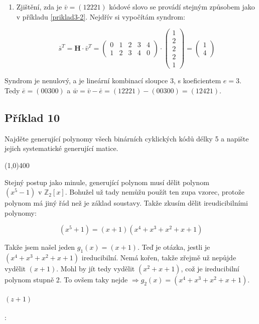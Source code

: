 \documentclass{article}
\begin{document}
\begin{enumerate}
	\item Zjištění, zda je $\bar{v} = (12221)$ kódové slovo se provádí stejným způsobem jako v příkladu \ref{priklad3-2}. Nejdřív si vypočítám syndrom:
	
	\[ \bar{s}^T = \mathbf{H}\cdot\bar{v}^T = 
	\begin{pmatrix}
		0 & 1 & 2 & 3 & 4 \\
	  1 & 2 & 3 & 4 & 0
	\end{pmatrix}\cdot
	\begin{pmatrix}
		1\\
	  2\\
	  2\\
	  2\\
	  1
	\end{pmatrix} =  
	\begin{pmatrix}
		1\\
	  4
	\end{pmatrix} \]
\end{enumerate}

Syndrom je nenulový, a je lineární kombinací sloupce 3, s koeficientem $e = 3$. Tedy $\bar{e}=(00300)$ a $\bar{w} = \bar{v} - \bar{e} = (12221) - (00300) = (12421)$. 


\subsection{Příklad 10}
Najděte generující polynomy všech binárních cyklických kódů délky 5 a napište jejich systematické generující matice.

\line(1,0){400}

Stejný postup jako minule, generující polynom musí dělit polynom $(x^5 - 1) \mbox{ v } \mathbb{Z}_2[x]$. Bohužel už tady nemůžu použít ten zupa vzorec, protože polynom má jiný řád než je základ soustavy. Takže zkusím dělit ireudicibilními polynomy:

\[ (x^5 + 1) = (x+1)(x^4 + x^3 + x^2 + x + 1)\]

Takže jsem našel jeden $g_1(x) = (x+1)$. Teď je otázka, jestli je $(x^4 + x^3 + x^2 + x + 1)$ ireducibilní. Nemá kořen, takže zřejmě už nepůjde vydělit $(x+1)$. Mohl by jít tedy vydělit $(x^2 + x + 1)$, což je ireducibilní polynom stupně 2. To ovšem taky nejde $\Rightarrow g_2(x) = (x^4 + x^3 + x^2 + x + 1)$. 

\paragraph {$(z+1)$}:
\end{document}
